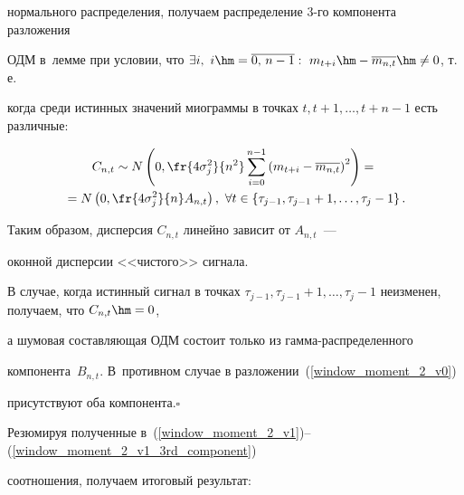     нормального распределения, получаем распределение 3-го компонента разложения


    ОДМ в~лемме при условии, что $\exists i,\ i\hm=\overline{0,\, n-1}:\ m_{t+i}


    \hm- \overline{m_{n,t}} \hm\neq 0$, т.\,е.\


     когда среди истинных значений миограммы в точках $t,  t+1 , \ldots ,


     t+n-1$ есть различные:


\begin{multline*}


        C_{n,t}\sim N\left(0, \fr{4\sigma^2_j}{n^2}


        \sum\limits^{n-1}_{i=0}\left(m_{t+i} - \overline{m_{n,t}}\right)^2\right) ={}\\


        {}=


        N\left(0, \fr{4\sigma^2_j}{n}A_{n,t}\right), \  \forall t


        \in \{\tau_{j-1} ,  \tau_{j-1}+1 , \ldots ,  \tau_{j}-1\}\,.


\end{multline*}





    Таким образом, дисперсия $C_{n,t}$ линейно зависит от $A_{n,t}$~---


    оконной дисперсии <<чистого>> сигнала.





    В случае, когда истинный сигнал в точках $\tau_{j-1},  \tau_{j-1}+1, \ldots ,


     \tau_{j}-1$ неизменен, получаем, что $C_{n,t} \hm= 0$,


     а шумовая составляющая ОДМ состоит только из гам\-ма-рас\-пре\-де\-лен\-но\-го


     компонента~$B_{n,t}$. В~противном случае в разложении~(\ref{window_moment_2_v0})


     присутствуют оба компонента.\hfill$\square$





\smallskip





Резюмируя полученные в~(\ref{window_moment_2_v1})--(\ref{window_moment_2_v1_3rd_component})


соотношения, получаем итоговый результат:


